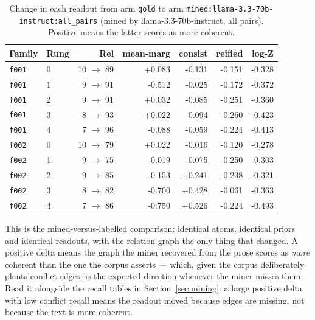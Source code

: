 \documentclass[11pt]{article}
\begin{document}
\begin{table}[htbp]
\centering
\small
\caption{Change in each readout from arm \texttt{gold} to arm \texttt{mined:llama-3.3-70b-instruct:all\_pairs} (mined by llama-3.3-70b-instruct, all pairs). Positive means the latter scores as more coherent.}
\label{tab:arm-delta-gold-mined-llama-3-3-70b-instruct-all-pairs}
\begin{tabular}{llrrrrr}
\toprule
Family & Rung & Rel & \textbf{mean-marg} & \textbf{consist} & \textbf{reified} & \textbf{log-Z} \\
\midrule
\texttt{f001} & 0 & 10 $\to$ 89 & +0.083 & -0.131 & -0.151 & -0.328 \\
\texttt{f001} & 1 & 9 $\to$ 91 & -0.512 & -0.025 & -0.172 & -0.372 \\
\texttt{f001} & 2 & 9 $\to$ 91 & +0.032 & -0.085 & -0.251 & -0.360 \\
\texttt{f001} & 3 & 8 $\to$ 93 & +0.022 & -0.094 & -0.260 & -0.423 \\
\texttt{f001} & 4 & 7 $\to$ 96 & -0.088 & -0.059 & -0.224 & -0.413 \\
\texttt{f002} & 0 & 10 $\to$ 79 & +0.022 & -0.016 & -0.120 & -0.278 \\
\texttt{f002} & 1 & 9 $\to$ 75 & -0.019 & -0.075 & -0.250 & -0.303 \\
\texttt{f002} & 2 & 9 $\to$ 85 & -0.153 & +0.241 & -0.238 & -0.321 \\
\texttt{f002} & 3 & 8 $\to$ 82 & -0.700 & +0.428 & -0.061 & -0.363 \\
\texttt{f002} & 4 & 7 $\to$ 86 & -0.750 & +0.526 & -0.224 & -0.493 \\
\bottomrule
\end{tabular}
\end{table}

This is the mined-versus-labelled comparison: identical atoms, identical priors and identical readouts, with the relation graph the only thing that changed. A positive delta means the graph the miner recovered from the prose scores as \emph{more} coherent than the one the corpus asserts --- which, given the corpus deliberately plants conflict edges, is the expected direction whenever the miner misses them. Read it alongside the recall tables in Section~\ref{sec:mining}: a large positive delta with low conflict recall means the readout moved because edges are missing, not because the text is more coherent.
\end{document}
